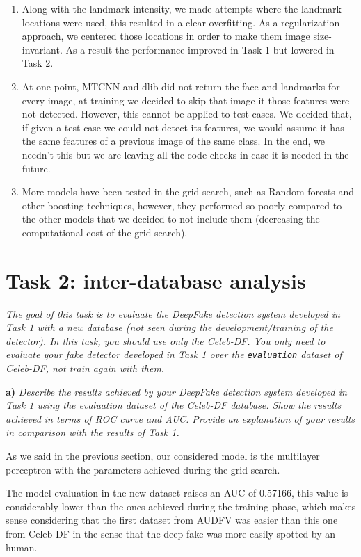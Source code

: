 \documentclass[11pt]{article}
\begin{document}
\begin{enumerate}
  \item Along with the landmark intensity, we made attempts where the landmark locations were used, this resulted in a clear overfitting. As a regularization approach, we centered those locations in order to make them image size-invariant. As a result the performance improved in Task 1 but lowered in Task 2.
  \item At one point, MTCNN and dlib did not return the face and landmarks for every image, at training we decided to skip that image it those features were not detected. However, this cannot be applied to test cases. We decided that, if given a test case we could not detect its features, we would assume it has the same features of a previous image of the same class. In the end, we needn't this but we are leaving all the code checks in case it is needed in the future.
  \item More models have been tested in the grid search, such as Random forests and other boosting techniques, however, they performed so poorly compared to the other models that we decided to not include them (decreasing the computational cost of the grid search).
\end{enumerate}

\section*{Task 2: inter-database analysis}

\textit{The goal of this task is to evaluate the DeepFake detection system developed in Task 1 with a new database (not seen during the development/training of the detector). In this task, you should use only the Celeb-DF. You only need to evaluate your fake detector developed in Task 1 over the \texttt{evaluation} dataset of Celeb-DF, not train again with them.}

\textbf{a)} \textit{Describe the results achieved by your DeepFake detection system developed in Task 1 using the evaluation dataset of the Celeb-DF database. Show the results achieved in terms of ROC curve and AUC. Provide an explanation of your results in comparison with the results of Task 1.}

As we said in the previous section, our considered model is the multilayer perceptron with the parameters achieved during the grid search. 

The model evaluation in the new dataset raises an AUC of 0.57166, this value is considerably lower than the ones achieved during the training phase, which makes sense considering that the first dataset from AUDFV was easier than this one from Celeb-DF in the sense that the deep fake was more easily spotted by an human. 
\end{document}
